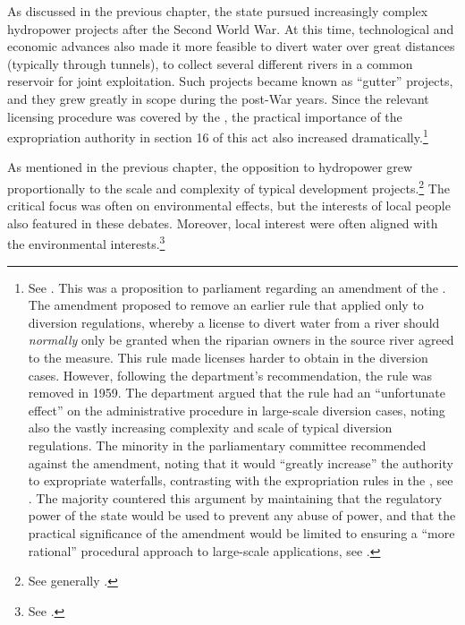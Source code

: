 As discussed in the previous chapter, the state pursued increasingly complex hydropower projects after the Second World War. At this time, technological and economic advances also made it more feasible to divert water over great distances (typically through tunnels), to collect several different rivers in a common reservoir for joint exploitation. Such projects became known as ``gutter'' projects, and they grew greatly in scope during the post-War years. Since the relevant licensing procedure was covered by the \cite{wra17}, the practical importance of the expropriation authority in section 16 of this act also increased dramatically.\footnote{See \cite[11]{innst59}. This was a proposition to parliament regarding an amendment of the \cite{wra17}. The amendment proposed to remove an earlier rule that applied only to diversion regulations, whereby a license to divert water from a river should {\it normally} only be granted when the riparian owners in the source river agreed to the measure. This rule made licenses harder to obtain in the diversion cases. However, following the department's recommendation, the rule was removed in 1959. The department argued that the rule had an ``unfortunate effect'' on the administrative procedure in large-scale diversion cases, noting also the vastly increasing complexity and scale of typical diversion regulations. The minority in the parliamentary committee recommended against the amendment, noting that it would ``greatly increase'' the authority to expropriate waterfalls, contrasting with the expropriation rules in the \cite{wra40}, see \cite[14]{innst59}. The majority countered this argument by maintaining that the regulatory power of the state would be used to prevent any abuse of power, and that the practical significance of the amendment would be limited to ensuring a ``more rational'' procedural approach to large-scale applications, see \cite[14]{innst59}.}

As mentioned in the previous chapter, the opposition to hydropower grew proportionally to the scale and complexity of typical development projects.\footnote{See generally \cite[64-65]{nilsen08}.} The critical focus was often on environmental effects, but the interests of local people also featured in these debates. Moreover, local interest were often aligned with the environmental interests.\footnote{See \cite[72-73]{nilsen08}.}

